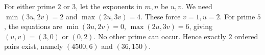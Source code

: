 For either prime $2$ or $3$, let the exponents in $m,n$ be $u,v$. We need $\min(3u,2v)=2$ and $\max(2u,3v)=4$. These force $v=1,u=2$. For prime $5$, the equations are $\min(3u,2v)=0$, $\max(2u,3v)=6$, giving $(u,v)=(3,0)$ or $(0,2)$. No other prime can occur. Hence exactly $\boxed2$ ordered pairs exist, namely $(4500,6)$ and $(36,150)$.
